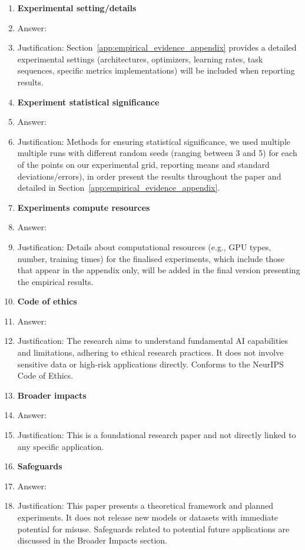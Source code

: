 \documentclass{article}
\numberwithin{figure}{section}
\begin{document}
\begin{enumerate}
\item {\bf Experimental setting/details}
    \item Answer: \answerYes{} %
    \item Justification: Section~\ref{app:empirical_evidence_appendix} provides a detailed experimental settings (architectures, optimizers, learning rates, task sequences, specific metrics implementations) will be included when reporting results.

\item {\bf Experiment statistical significance}
    \item Answer: \answerYes{} %
    \item Justification: Methods for ensuring statistical significance, we used multiple multiple runs with different random seeds (ranging between 3 and 5) for each of the points on our experimental grid, reporting means and standard deviations/errors), in order present the results throughout the paper and detailed in  Section~\ref{app:empirical_evidence_appendix}.

\item {\bf Experiments compute resources}
    \item Answer: \answerNo{}
    \item Justification: Details about computational resources (e.g., GPU types, number, training times) for the finalised experiments, which include those that appear in the appendix only, will be added in the final version presenting the empirical results.

\item {\bf Code of ethics}
    \item Answer: \answerYes{}
    \item Justification: The research aims to understand fundamental AI capabilities and limitations, adhering to ethical research practices. It does not involve sensitive data or high-risk applications directly. Conforms to the NeurIPS Code of Ethics.

\item {\bf Broader impacts}
    \item Answer: \answerNA{}
    \item Justification: This is a foundational research paper and not directly linked to any specific application. 

\item {\bf Safeguards}
    \item Answer: \answerNA{}
    \item Justification: This paper presents a theoretical framework and planned experiments. It does not release new models or datasets with immediate potential for misuse. Safeguards related to potential future applications are discussed in the Broader Impacts section.


\end{enumerate}
\end{document}
